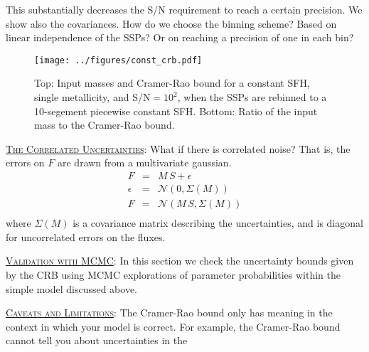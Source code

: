 \documentclass{article}
\begin{document}
This substantially decreases the S/N requirement to reach a certain precision.  
We show also the covariances.
How do we choose the binning scheme?  
Based on linear independence of the SSPs? Or on reaching a precision of one in each bin?

\begin{figure*}[h!]
\texttt{[image: ../figures/const\_crb.pdf]}
\caption{Top: Input masses and Cramer-Rao bound for a constant SFH, single metallicity, and S/N$= 10^2$, when the SSPs are rebinned to a 10-segement piecewise constant SFH.  Bottom: Ratio of the input mass to the Cramer-Rao bound. 
\label{fig:example_bin}}
\end{figure*}


\underline{\textsc{The Correlated Uncertainties}}:
What if there is correlated noise? That is, the errors on $F$ are drawn from a multivariate gaussian.
\begin{eqnarray}
F & = & M \, S + \epsilon \\
\epsilon & = & \mathcal{N}(0, \Sigma(M)) \\
F & = & \mathcal{N}(M \, S, \Sigma(M)) \\
\end{eqnarray}
where $\Sigma(M)$ is a covariance matrix describing the uncertainties, and is diagonal for uncorrelated errors on the fluxes.

\underline{\textsc{Validation with MCMC}}:
In this section we check the uncertainty bounds given by the CRB using MCMC explorations of parameter probabilities within the simple model discussed above.


\underline{\textsc{Caveats and Limitations}}:
The Cramer-Rao bound only has meaning in the context in which your model is correct.
For example, the Cramer-Rao bound cannot tell you about uncertainties in the 
\end{document}
